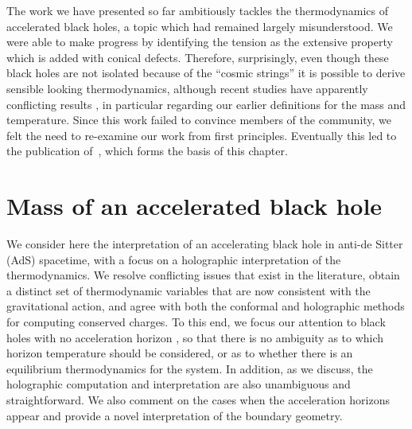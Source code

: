 \documentclass[
twoside,
openright,
frontopenright,
]{dmathesis}
\begin{document}
The work we have presented so far ambitiously tackles the thermodynamics of
accelerated black holes, a topic which had remained largely misunderstood. We
were able to make progress by identifying the tension as the extensive property
which is added with conical defects. Therefore, surprisingly, even though these
black holes are not isolated because of the ``cosmic strings'' it is possible to
derive sensible looking thermodynamics, although recent studies have apparently
conflicting results
\cite{Appels:2016uha,Appels:2017xoe,Gregory:2017ogk,Astorino:2016ybm}, in
particular regarding our earlier definitions for the mass and temperature. Since
this work failed to convince members of the community, we felt the need to
re-examine our work from first principles. Eventually this led to the
publication of~\cite{Anabalon:2018ydc}, which forms the basis of this chapter.

\section{Mass of an accelerated black hole}
\label{sec:mass-an-accelerated}

We consider here the interpretation of an accelerating black hole in anti-de
Sitter (AdS) spacetime, with a focus on a holographic interpretation of the
thermodynamics. We resolve conflicting issues that exist in the literature,
obtain a distinct set of thermodynamic variables that are now consistent with
the gravitational action, and agree with both the conformal and holographic
methods for computing conserved charges. To this end, we focus our attention to
black holes with no acceleration horizon \cite{Podolsky:2002nk}, so that there
is no ambiguity as to which horizon temperature should be considered, or as to
whether there is an equilibrium thermodynamics for the system. In addition, as
we discuss, the holographic computation and interpretation are also unambiguous
and straightforward. We also comment on the cases when the acceleration horizons
appear and provide a novel interpretation of the boundary geometry.
\end{document}
